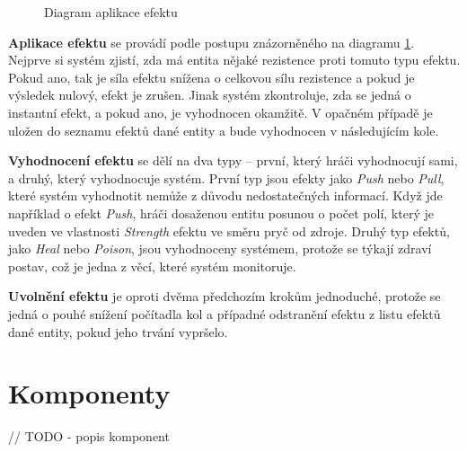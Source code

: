 \begin{figure}[h]
    \centering
    \caption{Diagram aplikace efektu}
    \label{diag:apply_effect}
\end{figure}

\textbf{Aplikace efektu} se provádí podle postupu znázorněného na diagramu \ref{diag:apply_effect}. Nejprve si systém zjistí, zda má entita nějaké rezistence proti tomuto typu efektu. Pokud ano, tak je síla efektu snížena o celkovou sílu rezistence a pokud je výsledek nulový, efekt je zrušen. Jinak systém zkontroluje, zda se jedná o instantní efekt, a pokud ano, je vyhodnocen okamžitě. V opačném případě je uložen do seznamu efektů dané entity a bude vyhodnocen v následujícím kole.

\textbf{Vyhodnocení efektu} se dělí na dva typy -- první, který hráči vyhodnocují sami, a druhý, který vyhodnocuje systém. První typ jsou efekty jako \textit{Push} nebo \textit{Pull}, které systém vyhodnotit nemůže z důvodu nedostatečných informací. Když jde například o efekt \textit{Push}, hráči dosaženou entitu posunou o počet polí, který je uveden ve vlastnosti \textit{Strength} efektu ve směru pryč od zdroje. Druhý typ efektů, jako \textit{Heal} nebo \textit{Poison}, jsou vyhodnoceny systémem, protože se týkají zdraví postav, což je jedna z věcí, které systém monitoruje.

\textbf{Uvolnění efektu} je oproti dvěma předchozím krokům jednoduché, protože se jedná o pouhé snížení počítadla kol a případné odstranění efektu z listu efektů dané entity, pokud jeho trvání vypršelo.


\section{Komponenty}
\label{sec:design_components}

// TODO - popis komponent